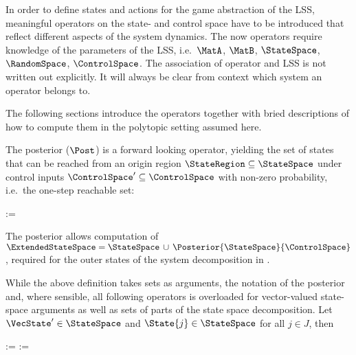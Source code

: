 In order to define states and actions for the game abstraction of the LSS, meaningful operators on the state- and control space have to be introduced that reflect different aspects of the system dynamics.
The now operators require knowledge of the parameters of the LSS, i.e.\ $\MatA$, $\MatB$, $\StateSpace$, $\RandomSpace$, $\ControlSpace$.
The association of operator and LSS is not written out explicitly.
It will always be clear from context which system an operator belongs to.

The following sections introduce the operators together with bried descriptions of how to compute them in the polytopic setting assumed here.


\startsubsection[title={Posterior}]

    The posterior ($\Post$) is a forward looking operator, yielding the set of states that can be reached from an origin region $\StateRegion \subseteq \StateSpace$ under control inputs $\ControlSpace' \subseteq \ControlSpace$ with non-zero probability, i.e.\ the one-step reachable set:

    \startformula
        \Posterior{\StateRegion}{\ControlRegion} :=  \EndPeriod
    \stopformula

    The posterior allows computation of $\ExtendedStateSpace = \StateSpace \,\cup\, \Posterior{\StateSpace}{\ControlSpace}$, required for the outer states of the system decomposition in .

    While the above definition takes sets as arguments, the notation of the posterior and, where sensible, all following operators is overloaded for vector-valued state-space arguments as well as sets of parts of the state space decomposition.
    Let $\VecState' \in \StateSpace$ and $\State{j} \in \StateSpace$ for all $j \in J$, then

    \startformula
        \startalign[n=2,align={right,left}]
            \NC {} :=
            \NC {} \EndAnd
            \NR
            \NC {} :=
            \NC {} \EndPeriod
            \NR
        \stopalign
    \stopformula

